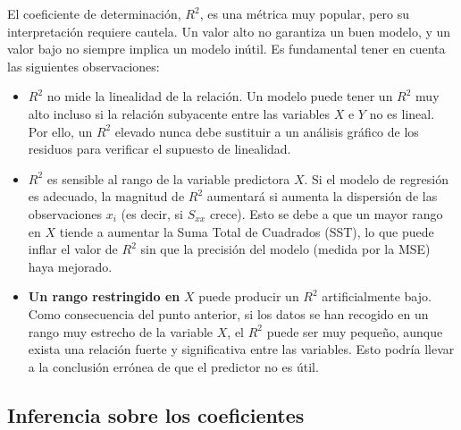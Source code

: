 \documentclass[
  letterpaper,
  DIV=11,
  numbers=noendperiod]{scrreprt}
\begin{document}
\begin{tcolorbox}[enhanced jigsaw, breakable, toprule=.15mm, bottomtitle=1mm, coltitle=black, colbacktitle=quarto-callout-caution-color!10!white, titlerule=0mm, opacitybacktitle=0.6, bottomrule=.15mm, toptitle=1mm, title=\textcolor{quarto-callout-caution-color}{\faFire}\hspace{0.5em}{Interpretación de R²}, arc=.35mm, rightrule=.15mm, opacityback=0, colframe=quarto-callout-caution-color-frame, leftrule=.75mm, left=2mm, colback=white]

El coeficiente de determinación, \(R^2\), es una métrica muy popular,
pero su interpretación requiere cautela. Un valor alto no garantiza un
buen modelo, y un valor bajo no siempre implica un modelo inútil. Es
fundamental tener en cuenta las siguientes observaciones:

\begin{itemize}
\item
  \(R^2\) no mide la linealidad de la relación. Un modelo puede tener un
  \(R^2\) muy alto incluso si la relación subyacente entre las variables
  \(X\) e \(Y\) no es lineal. Por ello, un \(R^2\) elevado nunca debe
  sustituir a un análisis gráfico de los residuos para verificar el
  supuesto de linealidad.
\item
  \(R^2\) es sensible al rango de la variable predictora \(X\). Si el
  modelo de regresión es adecuado, la magnitud de \(R^2\) aumentará si
  aumenta la dispersión de las observaciones \(x_i\) (es decir, si
  \(S_{xx}\) crece). Esto se debe a que un mayor rango en \(X\) tiende a
  aumentar la Suma Total de Cuadrados (SST), lo que puede inflar el
  valor de \(R^2\) sin que la precisión del modelo (medida por la MSE)
  haya mejorado.
\item
  \textbf{Un rango restringido en} \(X\) puede producir un \(R^2\)
  artificialmente bajo. Como consecuencia del punto anterior, si los
  datos se han recogido en un rango muy estrecho de la variable \(X\),
  el \(R^2\) puede ser muy pequeño, aunque exista una relación fuerte y
  significativa entre las variables. Esto podría llevar a la conclusión
  errónea de que el predictor no es útil.
\end{itemize}

\end{tcolorbox}

\subsection{Inferencia sobre los
coeficientes}\label{inferencia-sobre-los-coeficientes}
\end{document}
